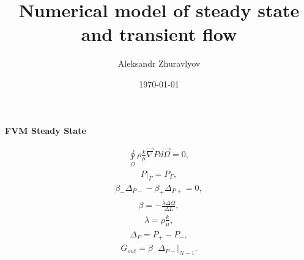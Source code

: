 \documentclass[a4paper,12pt]{extreport}
\author{Aleksandr Zhuravlyov}
\title{Numerical model of steady state and transient flow}
\date{\today}
\begin{document}
    \pagecolor{pageColor}
    \color{fontColor}

    \begin{multicols}{2}
        \begin{center}
        {\large \textbf{FVM Steady State}}
        \end{center}
        \begin{eqnarray}
            \label{eq:poisson_integral}
            \oint \limits_{\Omega} \rho \frac{k}{\mu} \vec{\nabla}P d\vec{\Omega} = 0,
        \end{eqnarray}
        \vspace{-0.5cm}
        \begin{eqnarray}
            \label{eq:poisson_integral_bound}
            P \Big|_\Gamma = P_\Gamma,
        \end{eqnarray}
        \begin{eqnarray}
            \label{eq:poisson_integral_num}
            \beta_{-}\Delta_{P-} - \beta_{+}\Delta_{P+} = 0,
        \end{eqnarray}
        \begin{eqnarray}
            \label{eq:beta}
            \beta = - \frac{\overline{\lambda} \Delta \Omega}{\Delta L},
        \end{eqnarray}
        \begin{eqnarray}
            \label{eq:lambda}
            \lambda = \rho \frac{k}{\mu},
        \end{eqnarray}
        \begin{eqnarray}
            \label{eq:delta_P_num}
            \Delta_{P} = P_{+} - P_{-},
        \end{eqnarray}
        \begin{eqnarray}
            \label{eq:Consumption_poisson_integral}
            G_{out} = \beta_-\Delta_{P-} \Big|_ {N-1}.
        \end{eqnarray}


\end{multicols}
\end{document}
